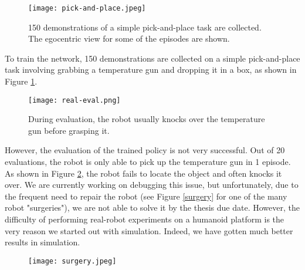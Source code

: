 \begin{figure}
	\centering
	\texttt{[image: pick-and-place.jpeg]}
    \caption{150 demonstrations of a simple pick-and-place task are collected. The egocentric view for some of the episodes are shown. }
    \label{fig:pick-and-place}
\end{figure}

To train the network, 150 demonstrations are collected on a simple pick-and-place task involving grabbing a temperature gun and dropping it in a box, as shown in Figure \ref{fig:pick-and-place}.

\begin{figure}
	\centering
	\texttt{[image: real-eval.png]}
    \caption{During evaluation, the robot usually knocks over the temperature gun before grasping it.}
    \label{fig:real-eval}
\end{figure}

However, the evaluation of the trained policy is not very successful. Out of 20 evaluations, the robot is only able to pick up the temperature gun in 1 episode. As shown in Figure \ref{fig:real-eval}, the robot fails to locate the object and often knocks it over. We are currently working on debugging this issue, but unfortunately, due to the frequent need to repair the robot (see Figure \ref{surgery} for one of the many robot "surgeries"), we are not able to solve it by the thesis due date. However, the difficulty of performing real-robot experiments on a humanoid platform is the very reason we started out with simulation. Indeed, we have gotten much better results in simulation.

\begin{figure}
	\centering
	\texttt{[image: surgery.jpeg]}
    \caption{}
    \label{fig:surgery}
\end{figure}
